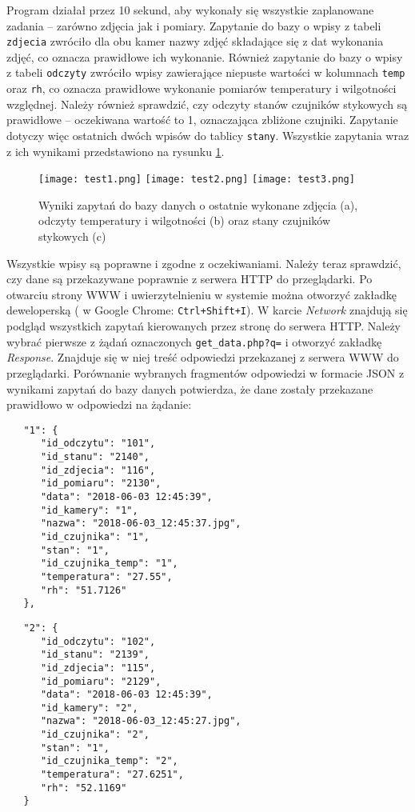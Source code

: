 \documentclass[a4paper,11pt,twoside]{article}
\begin{document}
Program działał przez 10 sekund, aby wykonały się wszystkie zaplanowane zadania -- zarówno zdjęcia jak i pomiary. Zapytanie do bazy o wpisy z tabeli \texttt{zdjecia} zwróciło dla obu kamer nazwy zdjęć składające się z dat wykonania zdjęć, co oznacza prawidłowe ich wykonanie. Również zapytanie do bazy o wpisy z tabeli \texttt{odczyty} zwróciło wpisy zawierające niepuste wartości w kolumnach \texttt{temp} oraz \texttt{rh}, co oznacza prawidłowe wykonanie pomiarów temperatury i wilgotności względnej. Należy również sprawdzić, czy odczyty stanów czujników stykowych są prawidłowe -- oczekiwana wartość to 1, oznaczająca zbliżone czujniki. Zapytanie dotyczy więc ostatnich dwóch wpisów do tablicy \texttt{stany}. Wszystkie zapytania wraz z ich wynikami przedstawiono na rysunku \ref{fig: test1}.
\begin{figure}
\begin{center}
\texttt{[image: test1.png]}
\texttt{[image: test2.png]}
\texttt{[image: test3.png]}
\caption{Wyniki zapytań do bazy danych o ostatnie wykonane zdjęcia (a), odczyty temperatury i wilgotności (b) oraz stany czujników stykowych (c)}
\label{fig: test1}
\end{center}
\end{figure}

Wszystkie wpisy są poprawne i zgodne z oczekiwaniami. Należy teraz sprawdzić, czy dane są przekazywane poprawnie z serwera HTTP do przeglądarki. Po otwarciu strony WWW i uwierzytelnieniu w systemie można otworzyć zakładkę deweloperską  
( w Google Chrome: \texttt{Ctrl+Shift+I}). W karcie \textit{Network} znajdują się podgląd wszystkich zapytań kierowanych przez stronę do serwera HTTP. Należy wybrać pierwsze z żądań oznaczonych \texttt{get{\_}data.php?q=} i otworzyć zakładkę \textit{Response}. Znajduje się w niej treść odpowiedzi przekazanej z serwera WWW do przeglądarki. Porównanie wybranych fragmentów odpowiedzi w formacie JSON z wynikami zapytań do bazy danych potwierdza, że dane zostały przekazane prawidłowo w odpowiedzi na żądanie:

\begin{minipage}{.5\textwidth}
\begin{lstlisting}
   "1": {
      "id_odczytu": "101",
      "id_stanu": "2140",
      "id_zdjecia": "116",
      "id_pomiaru": "2130",
      "data": "2018-06-03 12:45:39",
      "id_kamery": "1",
      "nazwa": "2018-06-03_12:45:37.jpg",
      "id_czujnika": "1",
      "stan": "1",
      "id_czujnika_temp": "1",
      "temperatura": "27.55",
      "rh": "51.7126"
   },
\end{lstlisting}
\end{minipage}\hfill
\begin{minipage}{.5\textwidth}
\begin{lstlisting}
   "2": {
      "id_odczytu": "102",
      "id_stanu": "2139",
      "id_zdjecia": "115",
      "id_pomiaru": "2129",
      "data": "2018-06-03 12:45:39",
      "id_kamery": "2",
      "nazwa": "2018-06-03_12:45:27.jpg",
      "id_czujnika": "2",
      "stan": "1",
      "id_czujnika_temp": "2",
      "temperatura": "27.6251",
      "rh": "52.1169"
   }
\end{lstlisting}
\end{minipage}
\end{document}
